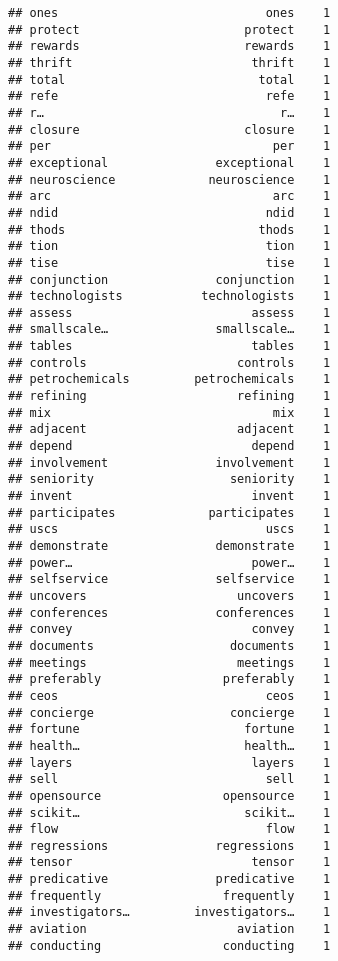 \documentclass[]{article}
\begin{document}
\begin{verbatim}
## ones                             ones    1
## protect                       protect    1
## rewards                       rewards    1
## thrift                         thrift    1
## total                           total    1
## refe                             refe    1
## r…                                 r…    1
## closure                       closure    1
## per                               per    1
## exceptional               exceptional    1
## neuroscience             neuroscience    1
## arc                               arc    1
## ndid                             ndid    1
## thods                           thods    1
## tion                             tion    1
## tise                             tise    1
## conjunction               conjunction    1
## technologists           technologists    1
## assess                         assess    1
## smallscale…               smallscale…    1
## tables                         tables    1
## controls                     controls    1
## petrochemicals         petrochemicals    1
## refining                     refining    1
## mix                               mix    1
## adjacent                     adjacent    1
## depend                         depend    1
## involvement               involvement    1
## seniority                   seniority    1
## invent                         invent    1
## participates             participates    1
## uscs                             uscs    1
## demonstrate               demonstrate    1
## power…                         power…    1
## selfservice               selfservice    1
## uncovers                     uncovers    1
## conferences               conferences    1
## convey                         convey    1
## documents                   documents    1
## meetings                     meetings    1
## preferably                 preferably    1
## ceos                             ceos    1
## concierge                   concierge    1
## fortune                       fortune    1
## health…                       health…    1
## layers                         layers    1
## sell                             sell    1
## opensource                 opensource    1
## scikit…                       scikit…    1
## flow                             flow    1
## regressions               regressions    1
## tensor                         tensor    1
## predicative               predicative    1
## frequently                 frequently    1
## investigators…         investigators…    1
## aviation                     aviation    1
## conducting                 conducting    1

\end{verbatim}
\end{document}
